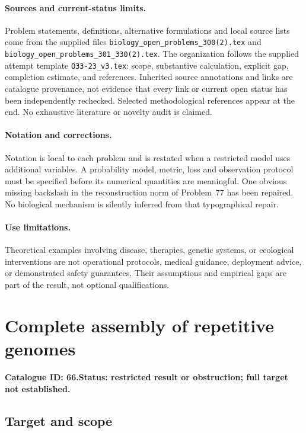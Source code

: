 \documentclass[11pt]{article}
\begin{document}
\paragraph{Sources and current-status limits.}
Problem statements, definitions, alternative formulations and local source lists
come from the supplied files
\texttt{biology\_open\_problems\_300(2).tex} and
\texttt{biology\_open\_problems\_301\_330(2).tex}.
The organization follows the supplied attempt template
\texttt{O33-23\_v3.tex}: scope, substantive calculation, explicit gap,
completion estimate, and references. Inherited source annotations and links are
catalogue provenance, not evidence that every link or current open status has
been independently rechecked. Selected methodological references appear at the
end. No exhaustive literature or novelty audit is claimed.

\paragraph{Notation and corrections.}
Notation is local to each problem and is restated when a restricted model uses
additional variables. A probability model, metric, loss and observation protocol
must be specified before its numerical quantities are meaningful. One obvious
missing backslash in the reconstruction norm of Problem~77 has been repaired.
No biological mechanism is silently inferred from that typographical repair.

\paragraph{Use limitations.}
Theoretical examples involving disease, therapies, genetic systems, or ecological
interventions are not operational protocols, medical guidance, deployment advice,
or demonstrated safety guarantees. Their assumptions and empirical gaps are part
of the result, not optional qualifications.

\setcounter{section}{65}
\section{Complete assembly of repetitive genomes}
\label{prob:066}
\noindent\textbf{Catalogue ID: 66.}\quad \textbf{Status: restricted result or obstruction; full target not established.}
\subsection{Target and scope}
\end{document}
